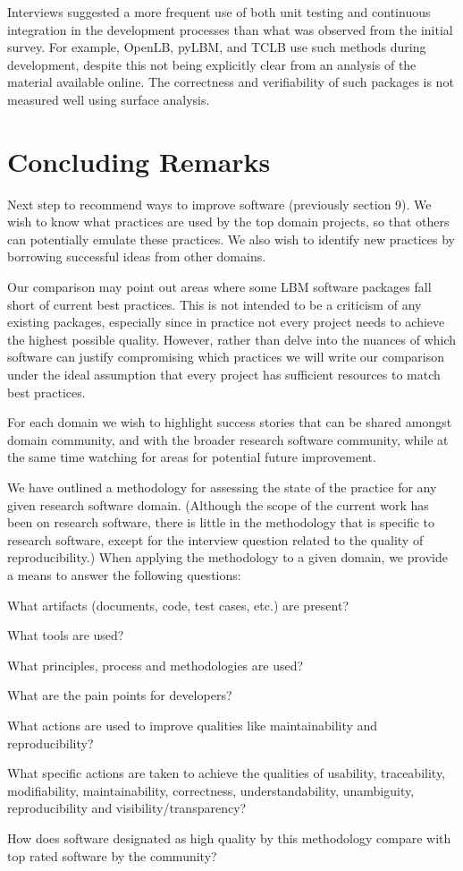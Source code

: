\documentclass[runningheads]{llncs}
\begin{document}
Interviews suggested a more frequent use of both unit testing and continuous
integration in the development processes than what was observed from the initial
survey. For example, OpenLB, pyLBM, and TCLB use such methods during
development, despite this not being explicitly clear from an analysis of the
material available online.  The correctness and verifiability of such packages
is not measured well using surface analysis.

\section{Concluding Remarks} \label{SecConcludingRemarks}

Next step to recommend ways to improve software (previously section 9).  We wish
to know what practices are used by the top domain projects, so that others can
potentially emulate these practices. We also wish to identify new practices by
borrowing successful ideas from other domains. 

Our comparison may point out areas where some LBM software
packages fall short of current best practices. This is not intended to be a
criticism of any existing packages, especially since in practice not every
project needs to achieve the highest possible quality.  However, rather than
delve into the nuances of which software can justify compromising which
practices we will write our comparison under the ideal assumption that every
project has sufficient resources to match best practices.

For each domain we wish to highlight success stories that can be shared amongst
domain community, and with the broader research software community, while at the
same time watching for areas for potential future improvement.

We have outlined a methodology for assessing the state of the practice for any
given research software domain.  (Although the scope of the current work has been
on research software, there is little in the methodology that is specific to
research software, except for the interview question related to the quality of
reproducibility.)  When applying the methodology to a given domain, we provide a
means to answer the following questions:
\begin{inparaenum}[i)]
\item What artifacts (documents, code, test cases, etc.) are present?
\item What tools are used?
\item What principles, process and methodologies are used?
\item What are the pain points for developers?
\item What actions are used to improve qualities like maintainability and
reproducibility?
\item What specific actions are taken to achieve the qualities of usability,
traceability, modifiability, maintainability, correctness, understandability,
unambiguity, reproducibility and visibility/transparency?
\item How does software designated as high quality by this methodology compare
  with top rated software by the community?
\end{inparaenum} 
\end{document}
